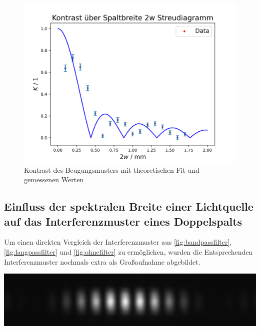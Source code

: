 \documentclass[11pt,ngerman]{scrartcl}
\begin{document}
\begin{figure}[H]
	\begin{center}
		\begin{minipage}[t]{0.7\textwidth}
			\includegraphics[width=\textwidth]{auswertung/kontrast}
		\end{minipage}
	\end{center}
	\caption{Kontrast des Beugungsmusters mit theoretischen Fit und gemessenen Werten}
	\label{fig:kontrast}
\end{figure}





\subsection{Einfluss der spektralen Breite einer Lichtquelle auf das Interferenzmuster eines Doppelspalts}

Um einen direkten Vergleich der Interferenzmuster aus \autoref{fig:bandpassfilter}, \autoref{fig:langpassfilter} und \autoref{fig:ohnefilter} zu ermöglichen, wurden die Entsprechenden Interferenzmuster nochmals extra als Großaufnahme abgebildet.

\begin{center}
	\begin{minipage}[t]{\textwidth}
		\includegraphics[width=\textwidth]{Interfero/Versuch2/bandpassfilter_m}
		\label{fig:bandpassfilter_m}
	\end{minipage}
\end{center}
\end{document}
